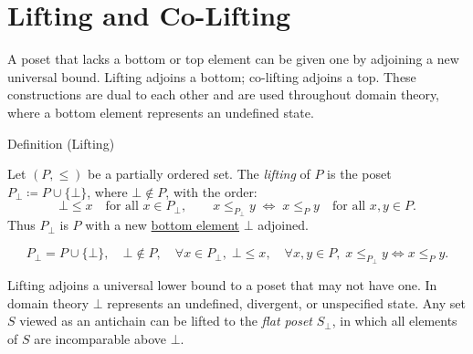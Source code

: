 
\section{Lifting and Co-Lifting}
\label{sec:lifting}

\begin{remark*}
A poset that lacks a bottom or top element can be given one by adjoining
a new universal bound.  Lifting adjoins a bottom; co-lifting adjoins a
top.  These constructions are dual to each other and are used throughout
domain theory, where a bottom element represents an undefined state.
\end{remark*}


\begin{definitionbox}{Definition (Lifting)}
\begin{definition}[Lifting]
\label{def:lifting}
Let $(P, \leq)$ be a partially ordered set.  The \emph{lifting} of $P$
is the poset $P_{\bot} \coloneqq P \cup \{\bot\}$, where $\bot \notin P$,
with the order:
\[
\bot \leq x \quad \text{for all } x \in P_{\bot},
\qquad
x \leq_{P_{\bot}} y \;\Longleftrightarrow\; x \leq_P y
\quad \text{for all } x, y \in P.
\]
Thus $P_{\bot}$ is $P$ with a new
\hyperref[def:bottom-element]{bottom element} $\bot$ adjoined.
\end{definition}
\end{definitionbox}

\begin{remark*}
\[
P_{\bot} = P \cup \{\bot\},\quad
\bot \notin P,\quad
\forall x \in P_{\bot},\; \bot \leq x,\quad
\forall x,y \in P,\; x \leq_{P_\bot} y \Leftrightarrow x \leq_P y.
\]
\end{remark*}

\begin{remark*}[Interpretation]
Lifting adjoins a universal lower bound to a poset that may not have one.
In domain theory $\bot$ represents an undefined, divergent, or
unspecified state.  Any set $S$ viewed as an antichain can be lifted to
the \emph{flat poset} $S_{\bot}$, in which all elements of $S$ are
incomparable above $\bot$.
\end{remark*}

